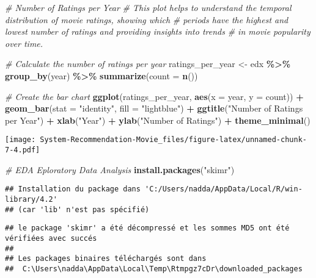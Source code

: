 \documentclass[
]{article}
\newenvironment{Shaded}{\begin{snugshade}}{\end{snugshade}}
\newcommand{\AttributeTok}[1]{\textcolor[rgb]{0.13,0.29,0.53}{#1}}
\newcommand{\CommentTok}[1]{\textcolor[rgb]{0.56,0.35,0.01}{\textit{#1}}}
\newcommand{\FunctionTok}[1]{\textcolor[rgb]{0.13,0.29,0.53}{\textbf{#1}}}
\newcommand{\NormalTok}[1]{#1}
\newcommand{\OtherTok}[1]{\textcolor[rgb]{0.56,0.35,0.01}{#1}}
\newcommand{\SpecialCharTok}[1]{\textcolor[rgb]{0.81,0.36,0.00}{\textbf{#1}}}
\newcommand{\StringTok}[1]{\textcolor[rgb]{0.31,0.60,0.02}{#1}}
\begin{document}
\begin{Shaded}
\begin{Highlighting}[]
\CommentTok{\# Number of Ratings per Year}
\CommentTok{\# This plot helps to understand the temporal distribution of movie ratings, showing which}
\CommentTok{\# periods have the highest and lowest number of ratings and providing insights into trends}
\CommentTok{\# in movie popularity over time.}

\CommentTok{\# Calculate the number of ratings per year}
\NormalTok{ratings\_per\_year }\OtherTok{\textless{}{-}}\NormalTok{ edx }\SpecialCharTok{\%\textgreater{}\%}
  \FunctionTok{group\_by}\NormalTok{(year) }\SpecialCharTok{\%\textgreater{}\%}
  \FunctionTok{summarize}\NormalTok{(}\AttributeTok{count =} \FunctionTok{n}\NormalTok{())}

\CommentTok{\# Create the bar chart}
\FunctionTok{ggplot}\NormalTok{(ratings\_per\_year, }\FunctionTok{aes}\NormalTok{(}\AttributeTok{x =}\NormalTok{ year, }\AttributeTok{y =}\NormalTok{ count)) }\SpecialCharTok{+}
  \FunctionTok{geom\_bar}\NormalTok{(}\AttributeTok{stat =} \StringTok{"identity"}\NormalTok{, }\AttributeTok{fill =} \StringTok{"lightblue"}\NormalTok{) }\SpecialCharTok{+}
  \FunctionTok{ggtitle}\NormalTok{(}\StringTok{"Number of Ratings per Year"}\NormalTok{) }\SpecialCharTok{+}
  \FunctionTok{xlab}\NormalTok{(}\StringTok{"Year"}\NormalTok{) }\SpecialCharTok{+}
  \FunctionTok{ylab}\NormalTok{(}\StringTok{"Number of Ratings"}\NormalTok{) }\SpecialCharTok{+}
  \FunctionTok{theme\_minimal}\NormalTok{()}
\end{Highlighting}
\end{Shaded}

\texttt{[image: System-Recommendation-Movie\_files/figure-latex/unnamed-chunk-7-4.pdf]}

\begin{Shaded}
\begin{Highlighting}[]
\CommentTok{\# EDA Eploratory Data Analysis }
\FunctionTok{install.packages}\NormalTok{(}\StringTok{"skimr"}\NormalTok{)}
\end{Highlighting}
\end{Shaded}

\begin{verbatim}
## Installation du package dans 'C:/Users/nadda/AppData/Local/R/win-library/4.2'
## (car 'lib' n'est pas spécifié)
\end{verbatim}

\begin{verbatim}
## le package 'skimr' a été décompressé et les sommes MD5 ont été vérifiées avec succés
## 
## Les packages binaires téléchargés sont dans
##  C:\Users\nadda\AppData\Local\Temp\Rtmpgz7cDr\downloaded_packages
\end{verbatim}
\end{document}
